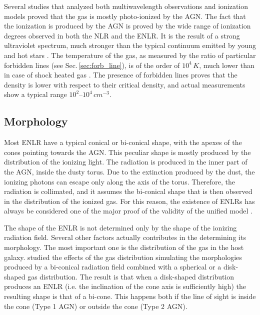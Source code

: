 \documentclass[../main.tex]{subfiles}
\begin{document}
Several studies that analyzed both multiwavelength observations and ionization models \citep[e.g.][]{Kraemer2000,Kallman01} proved that the gas is mostly photo-ionized by the AGN.
The fact that the ionization is produced by the AGN is proved by the wide range of ionization degrees observed in both the NLR and the ENLR.
It is the result of a strong ultraviolet spectrum, much stronger than the typical continuum emitted by young and hot stars \citep{OsterbrockAGN}.
The temperature of the gas, as measured by the ratio of particular forbidden lines (see Sec.\,\ref{sec:forb_line}), is of the order of $10^4\,\si{K}$, much lower than in case of shock heated gas \citep[$T\sim 5\times10^4$ K][]{OsterbrockAGN}.
The presence of forbidden lines proves that the density is lower with respect to their critical density, and actual measurements show a typical range $10^2$--$10^4\,\si{cm^{-3}}$.

\subsection{Morphology}

Most ENLR have a typical conical or bi-conical shape, with the apexes of the cones pointing towards the AGN.
This peculiar shape is mostly produced by the distribution of the ionizing light.
The radiation is produced in the inner part of the AGN, inside the dusty torus.
Due to the extinction produced by the dust, the ionizing photons can escape only along the axis of the torus.
Therefore, the radiation is collimated, and it assumes the bi-conical shape that is then observed in the distribution of the ionized gas.
For this reason, the existence of ENLRs has always be considered one of the major proof of the validity of the unified model \citep{Wilson94,Schmitt03b,He18}.

The shape of the ENLR is not determined only by the shape of the ionizing radiation field.
Several other factors actually contributes in the determining its morphology.
The most important one is the distribution of the gas in the host galaxy.
\citet{Mulchaey96b} studied the effects of the gas distribution simulating the morphologies produced by a bi-conical radiation field combined with a spherical or a disk-shaped gas distribution.
The result is that when a disk-shaped distribution produces an ENLR (i.e. the inclination of the cone axis is sufficiently high) the resulting shape is that of a bi-cone.
This happens both if the line of sight is inside the cone (Type 1 AGN) or outside the cone (Type 2 AGN).
\end{document}
